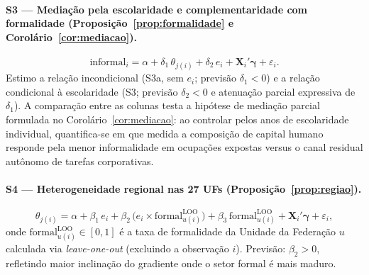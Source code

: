 \paragraph{S3 --- Mediação pela escolaridade e complementaridade com formalidade (Proposição~\ref{prop:formalidade} e Corolário~\ref{cor:mediacao}).}
\begin{equation}
    \text{informal}_i = \alpha + \delta_1 \, \theta_{j(i)} + \delta_2 \, e_i + \mathbf{X}_i' \boldsymbol{\gamma} + \varepsilon_i.
    \label{eq:s3}
\end{equation}
Estimo a relação incondicional (S3a, sem $e_i$; previsão $\delta_1 < 0$) e a relação condicional à escolaridade (S3; previsão $\delta_2 < 0$ e atenuação parcial expressiva de $\delta_1$). A comparação entre as colunas testa a hipótese de mediação parcial formulada no Corolário~\ref{cor:mediacao}: ao controlar pelos anos de escolaridade individual, quantifica-se em que medida a composição de capital humano responde pela menor informalidade em ocupações expostas versus o canal residual autônomo de tarefas corporativas.

\paragraph{S4 --- Heterogeneidade regional nas 27 UFs (Proposição~\ref{prop:regiao}).}
\begin{equation}
    \theta_{j(i)} = \alpha + \beta_1 \, e_i + \beta_2 \, \big(e_i \times \text{formal}_{u(i)}^{\text{LOO}}\big) + \beta_3 \, \text{formal}_{u(i)}^{\text{LOO}} + \mathbf{X}_i' \boldsymbol{\gamma} + \varepsilon_i,
    \label{eq:s4}
\end{equation}
onde $\text{formal}_{u(i)}^{\text{LOO}} \in [0,1]$ é a taxa de formalidade da Unidade da Federação $u$ calculada via \emph{leave-one-out} (excluindo a observação $i$). Previsão: $\beta_2 > 0$, refletindo maior inclinação do gradiente onde o setor formal é mais maduro.
